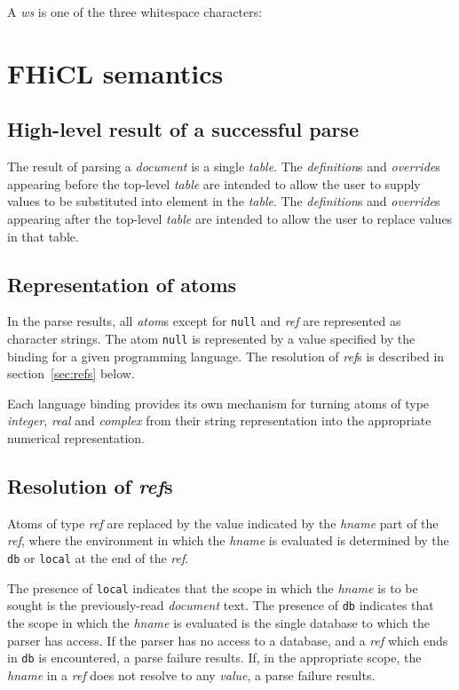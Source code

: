 \documentclass{memarticle}
\begin{document}
A \emph{ws} is one of the three whitespace characters:

\chapter{FHiCL semantics}
\section{High-level result of a successful parse}

The result of parsing a \emph{document}
is a single \emph{table}.
The \emph{definition}s and \emph{override}s
appearing before the top-level \emph{table}
are intended to allow the user
to supply values to be substituted into element in the \emph{table}.
The \emph{definition}s and \emph{override}s
appearing after the top-level \emph{table}
are intended to allow the user
to replace values in that table.

\section{Representation of atoms}
In the parse results,
all \emph{atom}s
except for \texttt{null} and \emph{ref}
are represented
as character strings.
The atom \texttt{null} is represented by a 
value specified by the binding for a given programming language.
The resolution of \emph{ref}s is described in section~\ref{sec:refs} below.

Each language binding
provides its own mechanism
for turning atoms of type \emph{integer}, \emph{real} and \emph{complex}
from their string representation
into the appropriate numerical representation.

\section{Resolution of \emph{ref}s\label{sec:refs}}
Atoms of type \emph{ref} are replaced
by the value indicated by the \emph{hname} part of the \emph{ref},
where the environment in which the \emph{hname} is evaluated is determined
by the \texttt{db} or \texttt{local} at the end of the \emph{ref}.

The presence of \texttt{local} indicates 
that the scope in which the \emph{hname} is to be sought
is the previously-read \emph{document} text.
The presence of \texttt{db} indicates
that the scope in which the \emph{hname} is evaluated
is the single database
to which the parser has access.
If the parser has no access to a database,
and a \emph{ref} which ends in \texttt{db} is encountered,
a parse failure results.
If,
in the appropriate scope,
the \emph{hname} in a \emph{ref} does not resolve to any \emph{value},
a parse failure results.
\end{document}
